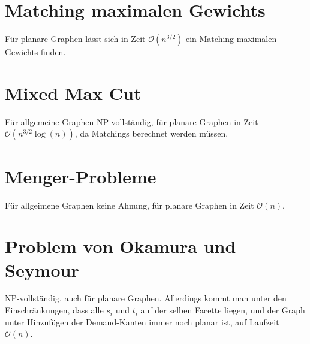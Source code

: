 \documentclass[a4paper,11pt]{report}
\begin{document}
\section{Matching maximalen Gewichts}
Für planare Graphen lässt sich in Zeit $\mathcal{O}(n^{3/2})$ ein Matching maximalen Gewichts finden.


\section{Mixed Max Cut}
Für allgemeine Graphen NP-vollständig, für planare Graphen in Zeit $\mathcal{O}(n^{3/2} \log(n))$, da Matchings berechnet werden müssen.


\section{Menger-Probleme}
Für allgeimene Graphen keine Ahnung, für planare Graphen in Zeit $\mathcal{O}(n)$.


\section{Problem von Okamura und Seymour}
NP-vollständig, auch für planare Graphen. Allerdings kommt man unter den Einschränkungen, dass alle $s_i$ und $t_i$ auf der selben Facette liegen, und der Graph unter Hinzufügen der Demand-Kanten immer noch planar ist, auf Laufzeit $\mathcal{O}(n)$.


\glsaddallunused
\printglossaries
\end{document}
